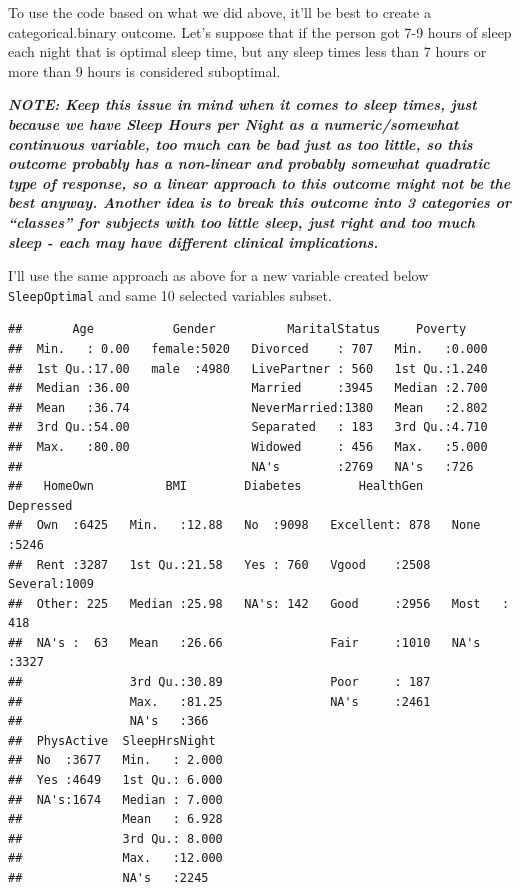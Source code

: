 \documentclass[]{article}
\newenvironment{Shaded}{\begin{snugshade}}{\end{snugshade}}
\newcommand{\KeywordTok}[1]{\textcolor[rgb]{0.13,0.29,0.53}{\textbf{{#1}}}}
\newcommand{\StringTok}[1]{\textcolor[rgb]{0.31,0.60,0.02}{{#1}}}
\newcommand{\CommentTok}[1]{\textcolor[rgb]{0.56,0.35,0.01}{\textit{{#1}}}}
\newcommand{\NormalTok}[1]{{#1}}
\begin{document}
To use the code based on what we did above, it'll be best to create a
categorical.binary outcome. Let's suppose that if the person got 7-9
hours of sleep each night that is optimal sleep time, but any sleep
times less than 7 hours or more than 9 hours is considered suboptimal.

\emph{\textbf{NOTE: Keep this issue in mind when it comes to sleep
times, just because we have Sleep Hours per Night as a numeric/somewhat
continuous variable, too much can be bad just as too little, so this
outcome probably has a non-linear and probably somewhat quadratic type
of response, so a linear approach to this outcome might not be the best
anyway. Another idea is to break this outcome into 3 categories or
``classes'' for subjects with too little sleep, just right and too much
sleep - each may have different clinical implications.}}

I'll use the same approach as above for a new variable created below
\texttt{SleepOptimal} and same 10 selected variables subset.

\begin{Shaded}
\end{Shaded}

\begin{verbatim}
##       Age           Gender          MaritalStatus     Poverty     
##  Min.   : 0.00   female:5020   Divorced    : 707   Min.   :0.000  
##  1st Qu.:17.00   male  :4980   LivePartner : 560   1st Qu.:1.240  
##  Median :36.00                 Married     :3945   Median :2.700  
##  Mean   :36.74                 NeverMarried:1380   Mean   :2.802  
##  3rd Qu.:54.00                 Separated   : 183   3rd Qu.:4.710  
##  Max.   :80.00                 Widowed     : 456   Max.   :5.000  
##                                NA's        :2769   NA's   :726    
##   HomeOwn          BMI        Diabetes        HealthGen      Depressed   
##  Own  :6425   Min.   :12.88   No  :9098   Excellent: 878   None   :5246  
##  Rent :3287   1st Qu.:21.58   Yes : 760   Vgood    :2508   Several:1009  
##  Other: 225   Median :25.98   NA's: 142   Good     :2956   Most   : 418  
##  NA's :  63   Mean   :26.66               Fair     :1010   NA's   :3327  
##               3rd Qu.:30.89               Poor     : 187                 
##               Max.   :81.25               NA's     :2461                 
##               NA's   :366                                                
##  PhysActive  SleepHrsNight   
##  No  :3677   Min.   : 2.000  
##  Yes :4649   1st Qu.: 6.000  
##  NA's:1674   Median : 7.000  
##              Mean   : 6.928  
##              3rd Qu.: 8.000  
##              Max.   :12.000  
##              NA's   :2245
\end{verbatim}
\end{document}
